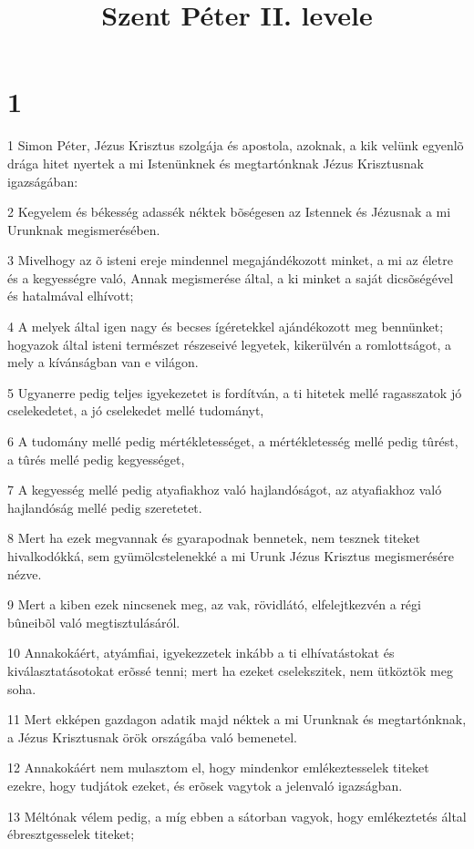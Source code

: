 

\title{Szent Péter II. levele}


\chapter{1}

\par 1 Simon Péter, Jézus Krisztus szolgája és apostola, azoknak, a  kik velünk egyenlõ drága hitet nyertek a mi Istenünknek és megtartónknak Jézus Krisztusnak igazságában:
\par 2 Kegyelem és békesség adassék néktek bõségesen az Istennek és Jézusnak a mi Urunknak megismerésében.
\par 3 Mivelhogy az õ isteni ereje mindennel megajándékozott minket, a mi az életre és a kegyességre való, Annak megismerése által, a ki minket a saját dicsõségével és hatalmával elhívott;
\par 4 A melyek által igen nagy és becses ígéretekkel ajándékozott meg bennünket; hogyazok által isteni természet részeseivé legyetek, kikerülvén a  romlottságot, a mely a kívánságban van e világon.
\par 5 Ugyanerre pedig teljes igyekezetet is fordítván, a ti hitetek mellé ragasszatok jó cselekedetet, a jó cselekedet mellé tudományt,
\par 6 A tudomány mellé pedig mértékletességet, a mértékletesség mellé pedig tûrést, a tûrés mellé pedig kegyességet,
\par 7 A kegyesség mellé pedig atyafiakhoz való hajlandóságot, az atyafiakhoz való hajlandóság mellé pedig szeretetet.
\par 8 Mert ha ezek megvannak és gyarapodnak bennetek, nem tesznek titeket hivalkodókká, sem gyümölcstelenekké a mi Urunk Jézus Krisztus megismerésére nézve.
\par 9 Mert a kiben ezek nincsenek meg, az vak, rövidlátó, elfelejtkezvén a régi bûneibõl való  megtisztulásáról.
\par 10 Annakokáért, atyámfiai, igyekezzetek inkább a ti elhívatástokat és kiválasztatásotokat erõssé tenni; mert ha ezeket cselekszitek, nem ütköztök meg soha.
\par 11 Mert ekképen gazdagon adatik majd néktek a mi Urunknak és megtartónknak, a Jézus Krisztusnak örök országába való bemenetel.
\par 12 Annakokáért nem mulasztom el, hogy mindenkor emlékeztesselek titeket ezekre, hogy tudjátok ezeket, és erõsek vagytok a jelenvaló igazságban.
\par 13 Méltónak vélem pedig, a míg ebben a sátorban vagyok, hogy emlékeztetés által ébresztgesselek titeket;
